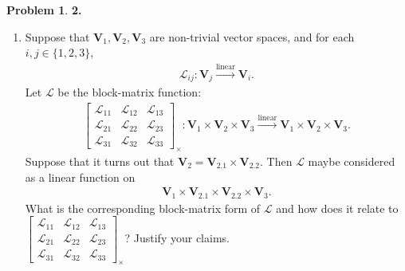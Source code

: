 \documentclass{book}
\theoremstyle{definition}
\newtheorem*{prob*}{Problem}
\newcommand{\V}{\mathbf{V}}
\newcommand{\lag}{\mathcal{L}}
\newcommand{\lin}{\overset{\text{linear}}{\longrightarrow}}
\begin{document}
\begin{prob*}\textbf{2. }\\
	
	\begin{enumerate}
	\item Suppose that $\V_1, \V_2, \V_3$ are non-trivial vector spaces, and for each $i,j \in \{1,2,3\}$,
	\begin{align*}
	\lag_{ij} : \V_j \lin \V_i.
	\end{align*}
	Let $\lag$ be the block-matrix function:
	\begin{align*}
	\begin{bmatrix}
	\lag_{11} & \lag_{12} & \lag_{13}\\
	\lag_{21} & \lag_{22} & \lag_{23}\\
	\lag_{31} & \lag_{32} & \lag_{33}
	\end{bmatrix}_\times : \V_1\times \V_2 \times \V_3 \lin \V_1\times \V_2\times \V_3.
	\end{align*}
	Suppose that it turns out that $\V_2 = \V_{2.1}\times \V_{2.2}$. Then $\lag$ maybe considered as a linear function on
	\begin{align*}
	\V_1 \times \V_{2.1}\times \V_{2.2} \times \V_3. 
	\end{align*}
	What is the corresponding block-matrix form of $\lag$ and how does it relate to $\begin{bmatrix}
	\lag_{11} & \lag_{12} & \lag_{13}\\
	\lag_{21} & \lag_{22} & \lag_{23}\\
	\lag_{31} & \lag_{32} & \lag_{33}
	\end{bmatrix}_\times$? Justify your claims.\\
	

\end{enumerate}
\end{prob*}
\end{document}
